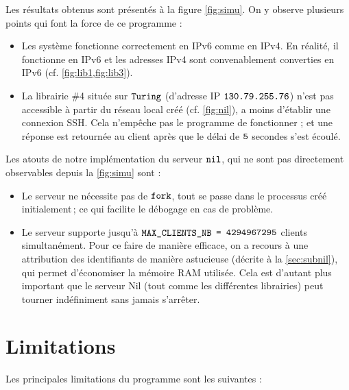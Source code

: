 \documentclass[
  french,
  twocolumn,
	9pt, %
]{fphw}
\begin{document}
\noindent Les résultats obtenus sont présentés à la figure \cref{fig:simu}. On y observe plusieurs points qui font la force de ce programme :
\begin{itemize}
  \item Les système fonctionne correctement en IPv6 comme en IPv4. En réalité, il fonctionne en IPv6 et les adresses IPv4 sont convenablement converties en IPv6 (cf. \cref{fig:lib1,fig:lib3}).
  \item La librairie \#4 située sur $\verb|Turing|$ (d'adresse IP $\verb|130.79.255.76|$) n'est pas accessible à partir du réseau local créé (cf. \cref{fig:nil}), a moins d'établir une connexion SSH. Cela n'empêche pas le programme de fonctionner ; et une réponse est retournée au client après que le délai de $\verb|5|$ secondes s'est écoulé.
\end{itemize} 

\noindent Les atouts de notre implémentation du serveur $\verb|nil|$, qui ne sont pas directement observables depuis la \cref{fig:simu} sont : 
\begin{itemize}
  \item Le serveur ne nécessite pas de $\verb|fork|$, tout se passe dans le processus créé initialement ; ce qui facilite le débogage en cas de problème.
  \item Le serveur supporte jusqu'à $\verb|MAX_CLIENTS_NB|$ $\verb|= 4294967295|$ clients simultanément. Pour ce faire de manière efficace, on a recours à une attribution des identifiants de manière astucieuse (décrite à la \cref{sec:subnil}), qui permet d'économiser la mémoire RAM utilisée. Cela est d'autant plus important que le serveur Nil (tout comme les différentes librairies) peut tourner indéfiniment sans jamais s'arrêter.
\end{itemize}


\section{Limitations}

Les principales limitations du programme sont les suivantes :
\end{document}

